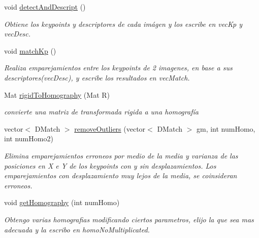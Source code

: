 \begin{DoxyCompactItemize}
\mbox{\label{classuav_1_1Stitcher_aa2e06db82b2e702285a1cc335aef9bfe}} 
void \mbox{\hyperlink{classuav_1_1Stitcher_aa2e06db82b2e702285a1cc335aef9bfe}{detect\+And\+Descript}} ()
\begin{DoxyCompactList}\small\item\em Obtiene los keypoints y descriptores de cada imágen y los escribe en vec\+Kp y vec\+Desc. \end{DoxyCompactList}\item 
\mbox{\label{classuav_1_1Stitcher_a4f2f80e5505962c031d2b788c621c8fd}} 
void \mbox{\hyperlink{classuav_1_1Stitcher_a4f2f80e5505962c031d2b788c621c8fd}{match\+Kp}} ()
\begin{DoxyCompactList}\small\item\em Realiza emparejamientos entre los keypoints de 2 imagenes, en base a sus descriptores(vec\+Desc), y escribe los resultados en vec\+Match. \end{DoxyCompactList}\item 
\mbox{\label{classuav_1_1Stitcher_a1d9236693b18d722cb5329c5edc29ea9}} 
Mat \mbox{\hyperlink{classuav_1_1Stitcher_a1d9236693b18d722cb5329c5edc29ea9}{rigid\+To\+Homography}} (Mat R)
\begin{DoxyCompactList}\small\item\em convierte una matriz de transformada rigida a una homografía \end{DoxyCompactList}\item 
\mbox{\label{classuav_1_1Stitcher_a1dfaf5c6e14e6234bfca0d8997bc0fc5}} 
vector$<$ D\+Match $>$ \mbox{\hyperlink{classuav_1_1Stitcher_a1dfaf5c6e14e6234bfca0d8997bc0fc5}{remove\+Outliers}} (vector$<$ D\+Match $>$ gm, int num\+Homo, int num\+Homo2)
\begin{DoxyCompactList}\small\item\em Elimina emparejamientos erroneos por medio de la media y varianza de las posiciones en X e Y de los keypoints con y sin desplazamientos. Los emparejamientos con desplazamiento muy lejos de la media, se coinsideran erroneos. \end{DoxyCompactList}\item 
void \mbox{\hyperlink{classuav_1_1Stitcher_aafe09514806435e6258d8740b9f6c122}{get\+Homography}} (int num\+Homo)
\begin{DoxyCompactList}\small\item\em Obtengo varias homografias modificando ciertos parametros, elijo la que sea mas adecuada y la escribo en homo\+No\+Multiplicated. \end{DoxyCompactList}\item 

\end{DoxyCompactItemize}
